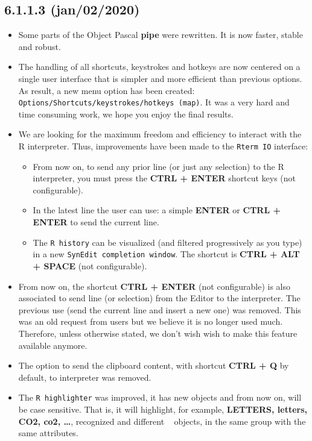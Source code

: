 \subsection*{6.1.1.3 (jan/02/2020)}
\begin{itemize}
  \item Some parts of the Object Pascal \textbf{pipe} were rewritten. It is now faster, stable and robust.
  \item The handling of all shortcuts, keystrokes and hotkeys are now centered on a single user interface
    that is simpler and more efficient than previous options. As result, a new menu option has been
    created: \texttt{Options/Shortcuts/keystrokes/hotkeys (map)}. It was a very hard and time consuming work,
    we hope you enjoy the final results.
  \item We are looking for the maximum freedom and efficiency to interact with the R interpreter.
    Thus, improvements have been made to the \texttt{Rterm IO} interface:
    \begin{itemize}
      \item From now on, to send any prior line (or just any selection) to the R interpreter, you must press the
        \textbf{CTRL + ENTER} shortcut keys (not configurable).
      \item In the latest line the user can use: a simple \textbf{ENTER} or \textbf{CTRL + ENTER} to send the current line.
      \item The \texttt{R history} can be visualized (and filtered progressively as you type) in a new \texttt{SynEdit completion window}.
        The shortcut is \textbf{CTRL + ALT + SPACE} (not configurable).
    \end{itemize}
  \item From now on, the shortcut \textbf{CTRL + ENTER} (not configurable) is also associated to send line (or selection) from the
    Editor to the \RR{} interpreter. The previous use (send the current line and insert a new one) was removed. This was an old request
    from users but we believe it is no longer used much. Therefore, unless otherwise stated, we don't wish wish to make this feature available anymore.
  \item The option to send the clipboard content, with shortcut \textbf{CTRL + Q} by default, to \RR{} interpreter was removed.
  \item The \texttt{R highlighter} was improved, it has new objects and from now on, will be case sensitive. That is, it will highlight, for example,
    \textbf{LETTERS, letters, CO2, co2, \ldots}, recognized and different \RR~ objects, in the same group with the same attributes.

\end{itemize}
